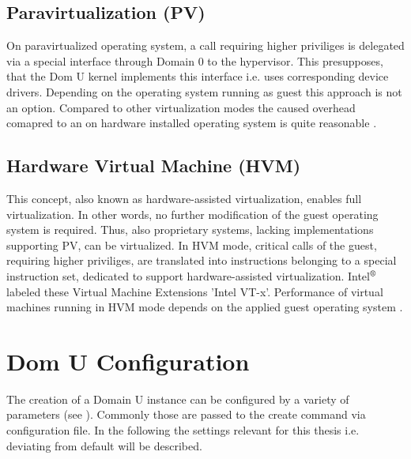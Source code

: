 \subsection{Paravirtualization (PV)}
On paravirtualized operating system, a call requiring higher priviliges is delegated via a special interface through Domain 0 to the hypervisor. This presupposes, that the Dom U kernel implements this interface i.e. uses corresponding device drivers. Depending on the operating system running as guest this approach is not an option. Compared to other virtualization modes the caused overhead comapred to an on hardware installed operating system is quite reasonable \cite{xenprjct}.

\subsection{Hardware Virtual Machine (HVM)}
This concept, also known as hardware-assisted virtualization, enables full virtualization. In other words, no further modification of the guest operating system is required. Thus, also proprietary systems, lacking implementations supporting PV, can be virtualized. In HVM mode, critical calls of the guest, requiring higher priviliges, are translated into instructions belonging to a special instruction set, dedicated to support hardware-assisted virtualization. Intel$^\text{\textregistered}$ labeled these Virtual Machine Extensions 'Intel VT-x'. Performance of virtual machines running in HVM mode depends on the applied guest operating system \cite{xenprjct}.  


\section{Dom U Configuration}
The creation of a Domain U instance can be configured by a variety of parameters (see \cite{xenxl}). Commonly 
those are passed to the create command via configuration file. In the following the settings relevant for this thesis i.e. deviating from default will be described.

